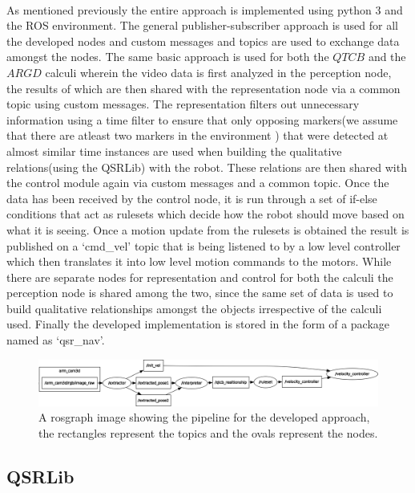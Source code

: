 \paragraph{} As mentioned previously the entire approach is implemented using python 3 and the ROS environment. The general publisher-subscriber approach is used for all the developed nodes and custom messages and topics are used to exchange data amongst the nodes. The same basic approach is used for both the $QTCB$ and the $ARGD$ calculi wherein the video data is first analyzed in the perception node, the results of which are then shared with the representation node via a common topic using custom messages. The representation filters out unnecessary information using a time filter to ensure that only opposing markers(we assume that there are atleast two markers in the environment ) that were detected at almost similar time instances are used when building the qualitative relations(using the QSRLib) with the robot. These relations are then shared with the control module again via custom messages and a common topic. Once the data has been received by the control node, it is run through a set of if-else conditions that act as rulesets which decide how the robot should move based on what it is seeing. Once a motion update from the rulesets is obtained the result is published on a `cmd\_vel' topic that is being listened to by a low level controller which then translates it into low level motion commands to the motors. While there are separate nodes for representation and control for both the calculi the perception node is shared among the two, since the same set of data is used to build qualitative relationships amongst the objects irrespective of the calculi used. Finally the developed implementation is stored in the form of a package named as `qsr\_nav'.

\begin{figure}[h!]
	\centering
	\includegraphics[scale=0.4]{images/rosgraph}
	\caption{A rosgraph image showing the pipeline for the developed approach, the rectangles represent the topics and the ovals represent the nodes.}
	\label{fig:rosgraph}
\end{figure}


\subsection{QSRLib}


